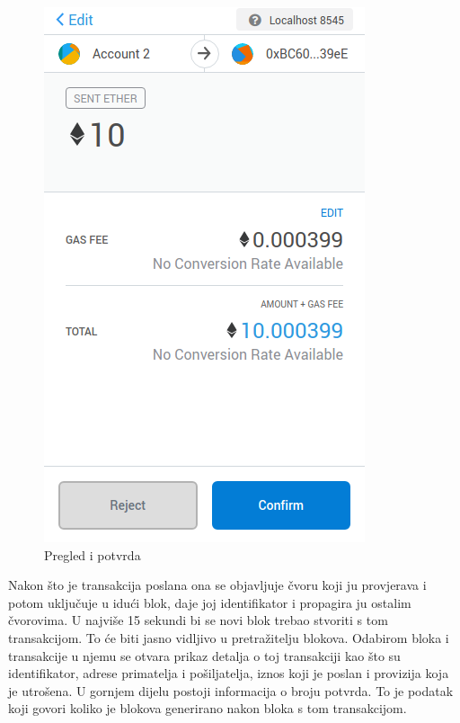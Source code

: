 \documentclass[times, utf8, zavrsni, numeric]{fer}
\begin{document}
\begin{figure}[ht]
\begin{minipage}[b]{0.4\textwidth}
    \includegraphics[width=\textwidth]{sent.png}
    \caption{Pregled i potvrda}
  \end{minipage}
\end{figure}

Nakon što je transakcija poslana ona se objavljuje čvoru koji ju provjerava i potom uključuje u idući blok, daje joj identifikator i propagira ju ostalim čvorovima.
U najviše 15 sekundi bi se novi blok trebao stvoriti s tom transakcijom. To će biti jasno vidljivo u pretražitelju blokova. Odabirom bloka i transakcije u njemu se otvara 
prikaz detalja o toj transakciji kao što su identifikator, adrese primatelja i pošiljatelja, iznos koji je poslan i provizija koja je utrošena. U gornjem dijelu postoji
informacija o broju potvrda. To je podatak koji govori koliko je blokova generirano nakon bloka s tom transakcijom.
\end{document}
